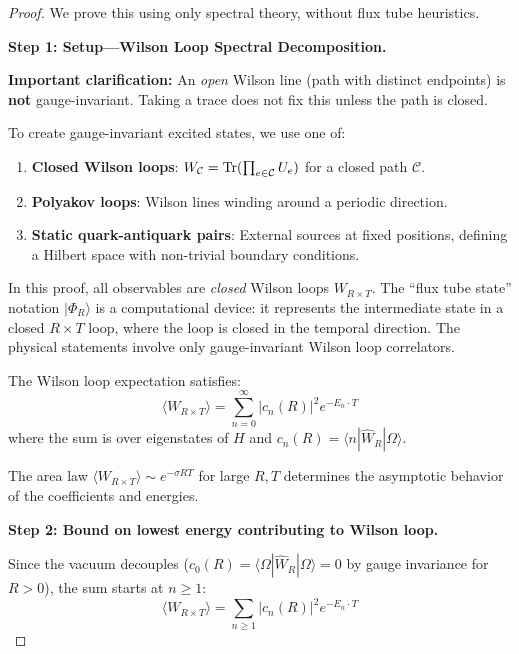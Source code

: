 \begin{proof}
We prove this using only spectral theory, without flux tube heuristics.

\textbf{Step 1: Setup---Wilson Loop Spectral Decomposition.}

\begin{tcolorbox}[colback=yellow!5, colframe=yellow!75!black, title=\textbf{Gauge Invariance---Rigorous Treatment}]
\textbf{Important clarification:} An \emph{open} Wilson line (path with distinct 
endpoints) is \textbf{not} gauge-invariant. Taking a trace does not fix this 
unless the path is closed.

To create gauge-invariant excited states, we use one of:
\begin{enumerate}
\item \textbf{Closed Wilson loops}: $W_{\mathcal{C}} = \operatorname{Tr}(\prod_{e \in \mathcal{C}} U_e)$ 
for a closed path $\mathcal{C}$.
\item \textbf{Polyakov loops}: Wilson lines winding around a periodic direction.
\item \textbf{Static quark-antiquark pairs}: External sources at fixed positions, 
defining a Hilbert space with non-trivial boundary conditions.
\end{enumerate}

In this proof, all observables are \emph{closed} Wilson loops $W_{R \times T}$. 
The ``flux tube state'' notation $|\Phi_R\rangle$ is a computational device: 
it represents the intermediate state in a closed $R \times T$ loop, where the 
loop is closed in the temporal direction. The physical statements involve only 
gauge-invariant Wilson loop correlators.
\end{tcolorbox}

The Wilson loop expectation satisfies:
\[
\langle W_{R \times T} \rangle = \sum_{n=0}^\infty |c_n(R)|^2 e^{-E_n \cdot T}
\]
where the sum is over eigenstates of $H$ and $c_n(R) = \langle n | \hat{W}_R | \Omega \rangle$.

The area law $\langle W_{R \times T} \rangle \sim e^{-\sigma R T}$ for large $R, T$ 
determines the asymptotic behavior of the coefficients and energies.

\textbf{Step 2: Bound on lowest energy contributing to Wilson loop.}

Since the vacuum decouples ($c_0(R) = \langle \Omega | \hat{W}_R | \Omega \rangle = 0$ 
by gauge invariance for $R > 0$), the sum starts at $n \geq 1$:
\[
\langle W_{R \times T} \rangle = \sum_{n \geq 1} |c_n(R)|^2 e^{-E_n \cdot T}
\]


\end{proof}
